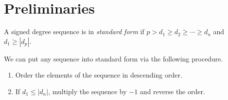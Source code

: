 \section{Preliminaries}
\begin{frame}
    A signed degree sequence is in \textit{standard form} if $p > d_1 \geq d_2 \geq \cdots \geq d_n$ and $d_1 \geq |d_p|$.

    We can put any sequence into standard form via the following procedure.

    \begin{enumerate}
        \item Order the elements of the sequence in descending order.
        \item If $d_1 \leq |d_n|$, multiply the sequence by $-1$ and reverse the order.
    \end{enumerate}
\end{frame}

